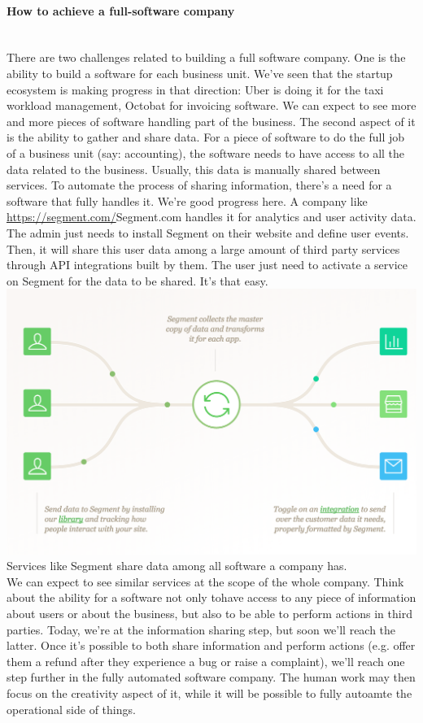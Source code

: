 \documentclass[12pt]{article}
\begin{document}
\paragraph{How to achieve a full-software company}
\\

There are two challenges related to building a full software company. 
One is the ability to build a software for each business unit. We've seen that the startup ecosystem is making progress in that direction: Uber is doing it for the taxi workload management, Octobat for invoicing software. We can expect to see more and more pieces of software handling part of the business. 
The second aspect of it is the ability to gather and share data. For a piece of software to do the full job of a business unit (say: accounting), the software needs to have access to all the data related to the business. Usually, this data is manually shared between services. To automate the process of sharing information, there's a need for a software that fully handles it. 
We're good progress here. A company like \url{https://segment.com/}{Segment.com} handles it for analytics and user activity data. The admin just needs to install Segment on their website and define user events. Then, it will share this user data among a large amount of third party services through API integrations built by them. The user just need to activate a service on Segment for the data to be shared. It's that easy. 
\\

\includegraphics[width=\textwidth]{segment}
Services like Segment share data among all software a company has. 
\\

We can expect to see similar services at the scope of the whole company. Think about the ability for a software not only tohave access to any piece of information about users or about the business, but also to be able to perform actions in third parties. Today, we're at the information sharing step, but soon we'll reach the latter. 
Once it's possible to both share information and perform actions (e.g. offer them a refund after they experience a bug or raise a complaint), we'll reach one step further in the fully automated software company. 
The human work may then focus on the creativity aspect of it, while it will be possible to fully autoamte the operational side of things.  
\end{document}
